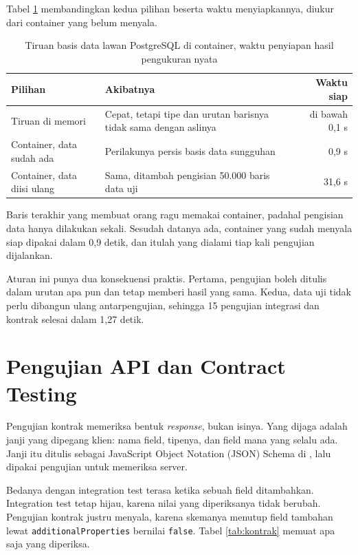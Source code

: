 Tabel \ref{tab:container} membandingkan kedua pilihan beserta waktu
menyiapkannya, diukur dari container yang belum menyala.

\begin{table}[!htb]
  \centering
  \caption{Tiruan basis data lawan PostgreSQL di container, waktu penyiapan
           hasil pengukuran nyata}
  \label{tab:container}
  \begin{tabularx}{\textwidth}{lXr}
    \hline
    \textbf{Pilihan} & \textbf{Akibatnya} & \textbf{Waktu siap} \\
    \hline
    Tiruan di memori & Cepat, tetapi tipe dan urutan barisnya tidak sama dengan aslinya & di bawah 0,1 s \\
    \hline
    Container, data sudah ada & Perilakunya persis basis data sungguhan & 0,9 s \\
    \hline
    Container, data diisi ulang & Sama, ditambah pengisian 50.000 baris data uji & 31,6 s \\
    \hline
  \end{tabularx}
\end{table}

Baris terakhir yang membuat orang ragu memakai container, padahal pengisian
data hanya dilakukan sekali. Sesudah datanya ada, container yang sudah
menyala siap dipakai dalam 0,9 detik, dan itulah yang dialami tiap kali
pengujian dijalankan.

Aturan ini punya dua konsekuensi praktis. Pertama, pengujian boleh ditulis
dalam urutan apa pun dan tetap memberi hasil yang sama. Kedua, data uji tidak
perlu dibangun ulang antarpengujian, sehingga 15 pengujian integrasi dan
kontrak selesai dalam 1,27 detik.

\section{Pengujian API dan Contract Testing}

Pengujian kontrak memeriksa bentuk \textit{response}, bukan isinya. Yang
dijaga adalah janji yang dipegang klien: nama field, tipenya, dan field mana
yang selalu ada. Janji itu ditulis sebagai JavaScript Object Notation (JSON) Schema
\cite{jsonschema-2020} di ,
lalu dipakai pengujian untuk memeriksa server.

Bedanya dengan integration test terasa ketika sebuah field ditambahkan.
Integration test tetap hijau, karena nilai yang diperiksanya tidak berubah.
Pengujian kontrak justru menyala, karena skemanya menutup field tambahan
lewat \texttt{additionalProperties} bernilai \texttt{false}. Tabel
\ref{tab:kontrak} memuat apa saja yang diperiksa.

